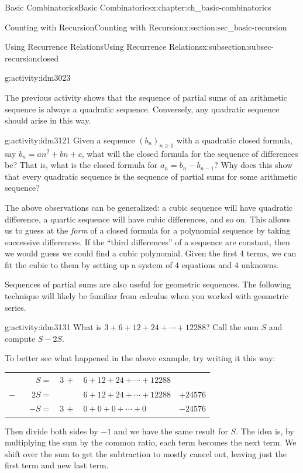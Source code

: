 \documentclass[oneside,10pt,]{book}
\numberwithin{equation}{chapter}
\newcommand{\hrulethin}  {\noalign{\hrule height 0.04em}}
\begin{document}
\begin{chapterptx}{Basic Combinatorics}{}{Basic Combinatorics}{}{}{x:chapter:ch_basic-combinatorics}
\begin{sectionptx}{Counting with Recursion}{}{Counting with Recursion}{}{}{x:section:sec_basic-recursion}
\begin{subsectionptx}{Using Recurrence Relations}{}{Using Recurrence Relations}{}{}{x:subsection:subsec-recursionclosed}
\begin{activity}{}{g:activity:idm3023}
\begin{enumerate}[font=\bfseries,label=(\alph*),ref=\alph*]
\end{enumerate}
\end{activity}
The previous activity shows that the sequence of partial sums of an arithmetic sequence is always a quadratic sequence.  Conversely, any quadratic sequence should arise in this way.%
\begin{activity}{}{g:activity:idm3121}%
Given a sequence \((b_n)_{n \ge 1}\) with a quadratic closed formula, say \(b_n = an^2 + bn + c\), what will the closed formula for the sequence of differences be?  That is, what is the closed formula for \(a_n = b_n - b_{n-1}\)?  Why does this show that every quadratic sequence is the sequence of partial sums for some arithmetic sequence?%
\end{activity}
The above observations can be generalized: a cubic sequence will have quadratic difference, a quartic sequence will have cubic differences, and so on.  This allows us to guess at the \emph{form} of a closed formula for a polynomial sequence by taking successive differences.  If the ``third differences'' of a sequence are constant, then we would guess we could find a cubic polynomial.  Given the first 4 terms, we can fit the cubic to them by setting up a system of 4 equations and 4 unknowns.%
\par
Sequences of partial sums are also useful for geometric sequences.  The following technique will likely be familiar from calculus when you worked with geometric series.%
\begin{activity}{}{g:activity:idm3131}%
What is \(3 + 6 + 12 + 24 + \cdots + 12288\)?  Call the sum \(S\) and compute \(S - 2S\).%
\end{activity}
To better see what happened in the above example, try writing it this way:%
\begin{sidebyside}{1}{0}{0}{0}%
\begin{sbspanel}{1}%
{\centering%
\begin{tabular}{rlll}
\(S=\)&\(3 \, +\)&\(6 + 12 + 24 + \cdots + 12288\)&\tabularnewline[0pt]
\(- \qquad 2S=\)&&\(6 + 12 + 24 + \cdots + 12288\)&\(+ 24576\)\tabularnewline\hrulethin
\(-S = \)&\(3 \, +\)&\(0 + 0 + 0 +  \cdots + 0 \)&\(-24576\)
\end{tabular}
\par}
\end{sbspanel}%
\end{sidebyside}%
\par
Then divide both sides by \(-1\) and we have the same result for \(S\). The idea is, by multiplying the sum by the common ratio, each term becomes the next term. We shift over the sum to get the subtraction to mostly cancel out, leaving just the first term and new last term.%

\end{subsectionptx}
\end{sectionptx}
\end{chapterptx}
\end{document}
